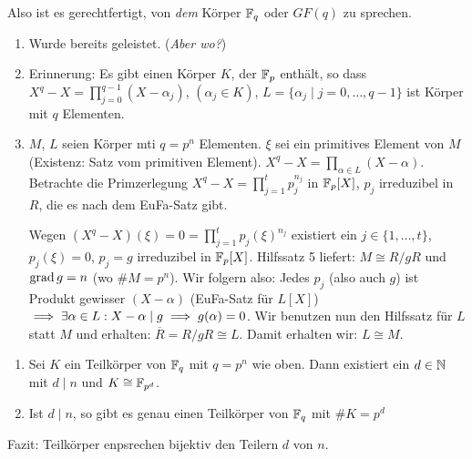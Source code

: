 \documentclass[a4paper,DIV15,BCOR12mm]{article}
\begin{document}
Also ist es gerechtfertigt, von \emph{dem} Körper $\mathbb{F}_q$ oder $GF(q)$ zu sprechen.

\begin{beweis}
\begin{enumerate}
\item Wurde bereits geleistet. (\emph{Aber wo?})
\item Erinnerung: Es gibt einen Körper $K$, der $\mathbb{F}_p$ enthält, so dass $X^q-X=\prod_{j=0}^{q-1}(X-\alpha_j)$, $(\alpha_j\in K)$, $L=\{\alpha_j\mid j=0,\ldots,q-1\}$ ist Körper mit $q$ Elementen.
\item $M$, $L$ seien Körper mti $q=p^n$ Elementen. $\xi$ sei ein primitives Element von $M$ (Existenz: Satz vom primitiven Element). $X^q-X = \prod_{\alpha \in L}(X-\alpha)$. Betrachte die Primzerlegung $X^q-X = \prod_{j=1}^tp_j^{n_j}$ in $\mathbb{F}_p[X]$, $p_j$ irreduzibel in $R$, die es nach dem EuFa-Satz gibt.

Wegen $(X^q-X)(\xi) = 0 = \prod_{j=1}^t p_j(\xi)^{n_j}$ existiert ein $j\in\{1,\ldots,t\}$, $p_j(\xi)=0$, $p_j=g$ irreduzibel in $\mathbb{F}_p[X]$. Hilfssatz 5 liefert: $M\cong R/gR$ und $\mathop{\rm grad}\nolimits g = n$ (wo $\#M=p^n$). Wir folgern also: Jedes $p_j$ (also auch $g$) ist Produkt gewisser $(X-\alpha)$ (EuFa-Satz für $L[X]$) $\implies \exists \alpha \in L: X-\alpha \mid g \implies g(\alpha) = 0$. Wir benutzen nun den Hilfssatz für $L$ statt $M$ und erhalten: $\overline R = R/gR \cong L$. Damit erhalten wir: $L\cong M$.
\end{enumerate}
\end{beweis}

\begin{satz}[Teilkörpersatz]
\begin{enumerate}
\item Sei $K$ ein Teilkörper von $\mathbb{F}_q$ mit $q=p^n$ wie oben. Dann existiert ein $d\in\mathbb{N}$ mit $d\mid n$ und $K\cong \mathbb{F}_{p^d}$.
\item Ist $d\mid n$, so gibt es genau einen Teilkörper von $\mathbb{F}_q$ mit $\#K=p^d$
\end{enumerate}

Fazit: Teilkörper enpsrechen bijektiv den Teilern $d$ von $n$.
\end{satz}
\end{document}
